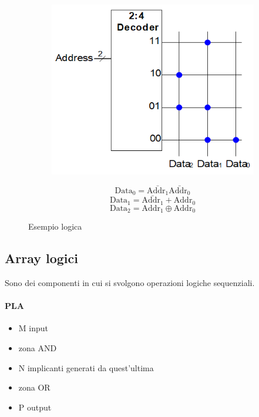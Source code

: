 \documentclass{article}
\begin{document}
\begin{figure}[ht]
    \begin{minipage}[t]{0.49\textwidth}
    \begin{figure}[H]
        \centering
        \includegraphics[width=\linewidth]{mem_logic.png}
        \label{fig:mem_logic}
    \end{figure}
    \end{minipage}
    \begin{minipage}[t]{0.49\textwidth}
    $$\text{Data}_0=\bar{\text{Addr}_1}\bar{\text{Addr}_0}$$
    $$\text{Data}_1=\bar{\text{Addr}_1}+\text{Addr}_0$$
    $$\text{Data}_2=\text{Addr}_1 \oplus \text{Addr}_0$$
\end{minipage}
\caption{Esempio logica}
\end{figure}

\subsection{Array logici}

Sono dei componenti in cui si svolgono operazioni logiche sequenziali.

\newpage

\paragraph{PLA}

\begin{itemize}
    \item M input
    \item zona AND
    \item N implicanti generati da quest'ultima
    \item zona OR
    \item P output
\end{itemize}
\end{document}
